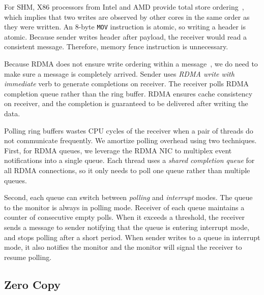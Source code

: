 For SHM, X86 processors from Intel and AMD provide total store ordering~\cite{sewell2010x86,intel-manual}, which implies that two writes are observed by other cores in the same order as they were written. An 8-byte \texttt{MOV} instruction is atomic, so writing a header is atomic. Because sender writes header after payload, the receiver would read a consistent message. Therefore, memory fence instruction is unnecessary.

Because RDMA does not ensure write ordering within a message~\cite{infiniband2000infiniband}, we do need to make sure a message is completely arrived. Sender uses \textit{RDMA write with immediate} verb to generate completions on receiver. The receiver polls RDMA completion queue rather than the ring buffer. RDMA ensures cache consistency on receiver, and the completion is guaranteed to be delivered after writing the data.


Polling ring buffers wastes CPU cycles of the receiver when a pair of threads do not communicate frequently. We amortize polling overhead using two techniques.
First, for RDMA queues, we leverage the RDMA NIC to multiplex event notifications into a single queue.
Each thread uses a \emph{shared completion queue} for all RDMA connections, so it only needs to poll one queue rather than multiple queues.

Second, each queue can switch between \textit{polling} and \textit{interrupt} modes. The queue to the monitor is always in polling mode. Receiver of each queue maintains a counter of consecutive empty polls. When it exceeds a threshold, the receiver sends a message to sender notifying that the queue is entering interrupt mode, and stops polling after a short period. When sender writes to a queue in interrupt mode, it also notifies the monitor and the monitor will signal the receiver to resume polling.





\subsection{Zero Copy}
\label{subsec:zerocopy}

